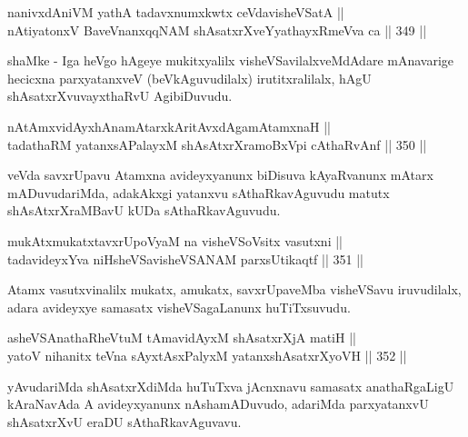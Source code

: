 \begin{shl}
nanivxdAniVM yathA tadavxnumxkwtx ceVdavisheVSatA || \\
nAtiyatonxV BaveVnanxqqNAM shAsatxrXveYyathayxRmeVva ca ||  349 ||  
\end{shl}

\begin{artha}
shaMke - Iga heVgo hAgeye mukitxyalilx visheVSavilalxveMdAdare
mAnavarige hecicxna parxyatanxveV (beVkAguvudilalx) irutitxralilalx,
hAgU shAsatxrXvuvayxthaRvU AgibiDuvudu.
\end{artha}


\begin{shl}
nA\s \s tAmxvidAyxhAnamAtarxkAritAvxdAgamAtamxnaH || \\
tadathaRM yatanxsAPalayxM shAsAtxrXramoBxV\s pi cAthaRvAnf ||  350 ||  
\end{shl}

\begin{artha}
veVda savxrUpavu Atamxna avideyxyanunx biDisuva kAyaRvanunx mAtarx
mADuvudariMda, adakAkxgi yatanxvu sAthaRkavAguvudu matutx
shAsAtxrXraMBavU kUDa sAthaRkavAguvudu.
\end{artha}

\begin{shl}
mukAtxmukatxtavxrUpoV\s yaM na visheVSoV\s sitx vasutxni || \\
tadavideyxYva niHsheVSavisheVSANAM parxsUtikaqtf ||  351 ||  
\end{shl}

\begin{artha}
Atamx vasutxvinalilx mukatx, amukatx, savxrUpaveMba visheVSavu
iruvudilalx, adara avideyxye samasatx visheVSagaLanunx huTiTxsuvudu.
\end{artha}

\begin{shl}
asheVSAnathaRheVtuM tAmavidAyxM shAsatxrXjA matiH || \\
yatoV nihanitx teVna sAyxtAsxPalyxM yatanxshAsatxrXyoVH ||  352 ||  
\end{shl}

\begin{artha}
yAvudariMda shAsatxrXdiMda huTuTxva jAcnxnavu samasatx anathaRgaLigU
kAraNavAda A avideyxyanunx nAshamADuvudo, adariMda parxyatanxvU
shAsatxrXvU eraDU sAthaRkavAguvavu.
\end{artha}


